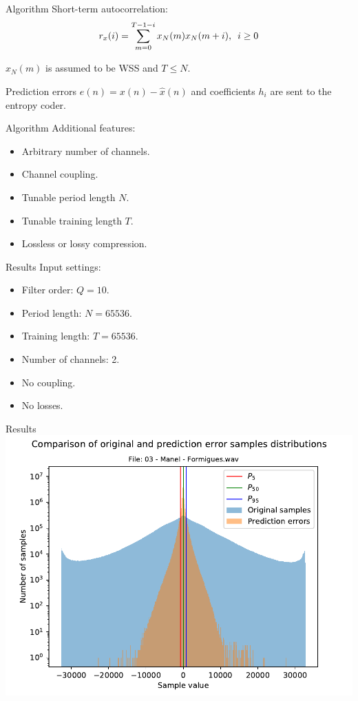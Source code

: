 \documentclass[usenames,dvipsnames]{beamer}
\begin{document}
\begin{frame}{Algorithm}
Short-term autocorrelation:
\[
r_x(i) = \sum_{m=0}^{T-1-i} x_N(m) x_N(m+i) ,\hspace{0.5em} i \geq 0
\]

$x_N(m)$ is assumed to be WSS and $T \leq N$.
\vspace{1em}

Prediction errors $e(n) = x(n) - \hat{x}(n)$ and coefficients $h_i$ are sent to the entropy coder.
\end{frame}

\begin{frame}{Algorithm}
Additional features:
\begin{itemize}
	\item<1-> Arbitrary number of channels.
	\item<1-> Channel coupling.
	\item<2-> Tunable period length $N$.
	\item<2-> Tunable training length $T$.
	\item<3-> Lossless or lossy compression.
\end{itemize}
\end{frame}

\begin{frame}{Results}
Input settings:
\begin{itemize}
	\item Filter order: $Q=10$.
	\item Period length: $N=65536$.
	\item Training length: $T=65536$.
	\item Number of channels: 2.
	\item No coupling.
	\item No losses.
\end{itemize}
\end{frame}

\begin{frame}{Results}
\centering
\includegraphics[scale=0.62]{graphics/03 - Manel - Formigues.wav_hist.pdf}
\end{frame}
\end{document}
